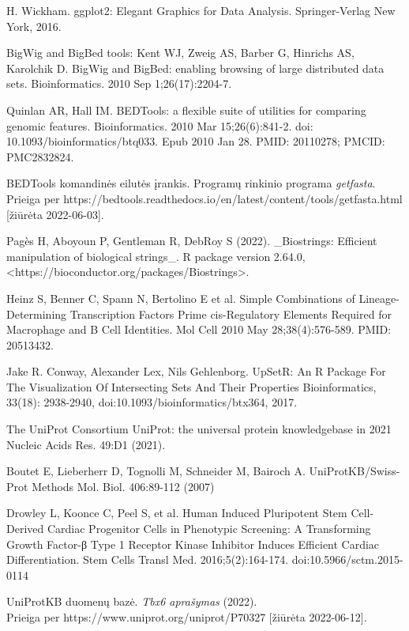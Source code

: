 \documentclass[12pt]{article}
\begin{document}
\begin{thebibliography}{99}
 H. Wickham. ggplot2: Elegant
Graphics for Data Analysis. Springer-Verlag New York, 2016.

 BigWig and BigBed tools: Kent WJ, Zweig AS, Barber G,
Hinrichs AS, Karolchik D. BigWig and BigBed: enabling browsing of large
distributed data sets. Bioinformatics. 2010 Sep 1;26(17):2204-7.

 Quinlan AR, Hall IM. BEDTools: a flexible suite of
utilities for comparing genomic features. Bioinformatics. 2010 Mar
15;26(6):841-2. doi: 10.1093/bioinformatics/btq033. Epub 2010 Jan 28.
PMID: 20110278; PMCID: PMC2832824.

 BEDTools komandinės eilutės įrankis.
Programų rinkinio programa \emph{getfasta}.\\
Prieiga per https://bedtools.readthedocs.io/en/latest/content/tools/getfasta.html
[žiūrėta 2022-06-03].

 Pagès H, Aboyoun P, Gentleman R, DebRoy S (2022). \_Biostrings:
Efficient manipulation of biological strings\_. R package version
2.64.0, <https://bioconductor.org/packages/Biostrings>.

 Heinz S, Benner C, Spann N, Bertolino E et al.
Simple Combinations of Lineage-Determining Transcription Factors
Prime cis-Regulatory Elements Required for Macrophage and B Cell
Identities. Mol Cell 2010 May 28;38(4):576-589. PMID: 20513432.

 Jake R. Conway, Alexander
Lex, Nils Gehlenborg. UpSetR: An R Package For The
Visualization Of Intersecting Sets And Their Properties
Bioinformatics, 33(18): 2938-2940,
doi:10.1093/bioinformatics/btx364, 2017.

 The UniProt Consortium
UniProt: the universal protein knowledgebase in 2021
Nucleic Acids Res. 49:D1 (2021).

 Boutet E, Lieberherr D, Tognolli M,
Schneider M, Bairoch A. UniProtKB/Swiss-Prot
Methods Mol. Biol. 406:89-112 (2007)

 Drowley L, Koonce C, Peel S, et al.
Human Induced Pluripotent Stem Cell-Derived Cardiac Progenitor
Cells in Phenotypic Screening: A Transforming Growth Factor-β
Type 1 Receptor Kinase Inhibitor Induces Efficient Cardiac
Differentiation. Stem Cells Transl Med. 2016;5(2):164-174.
doi:10.5966/sctm.2015-0114

 UniProtKB duomenų bazė. \emph{Tbx6 aprašymas} (2022).\\
Prieiga per https://www.uniprot.org/uniprot/P70327 [žiūrėta 2022-06-12].


\end{thebibliography}
\end{document}

